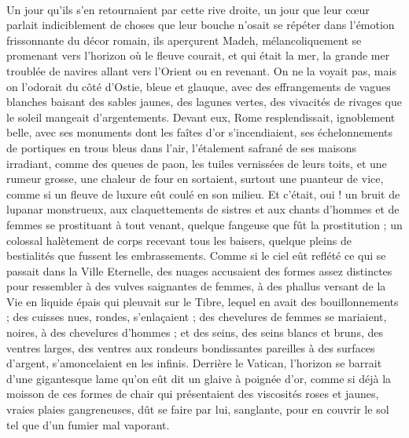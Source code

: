 \documentclass[a4paper, 11pt, oneside, polutonikogreek, french]{article}
\begin{document}
\paragraph{}
Un jour qu'ils s'en retournaient par cette rive droite, un jour que leur cœur parlait indiciblement de choses que leur bouche n'osait se répéter dans l'émotion frissonnante du décor romain, ils aperçurent Madeh, mélancoliquement se promenant vers l'horizon où le fleuve courait, et qui était la mer, la grande mer troublée de navires allant vers l'Orient ou en revenant. On ne la voyait pas, mais on l'odorait du côté d'Ostie, bleue et glauque, avec des effrangements de vagues blanches baisant des sables jaunes, des lagunes vertes, des vivacités de rivages que le soleil mangeait d'argentements. Devant eux, Rome resplendissait, ignoblement belle, avec ses monuments dont les faîtes d'or s'incendiaient, ses échelonnements de portiques en trous bleus dans l'air, l'étalement safrané de ses maisons irradiant, comme des queues de paon, les tuiles vernissées de leurs toits, et une rumeur grosse, une chaleur de four en sortaient, surtout une puanteur de vice, comme si un fleuve de luxure eût coulé en son milieu. Et c'était, oui ! un bruit de lupanar monstrueux, aux claquettements de sistres et aux chants d'hommes et de femmes se prostituant à tout venant, quelque fangeuse que fût la prostitution ; un colossal halètement de corps recevant tous les baisers, quelque pleins de bestialités que fussent les embrassements. Comme si le ciel eût reflété ce qui se passait dans la Ville Eternelle, des nuages accusaient des formes assez distinctes pour ressembler à des vulves saignantes de femmes, à des phallus versant de la Vie en liquide épais qui pleuvait sur le Tibre, lequel en avait des bouillonnements ; des cuisses nues, rondes, s'enlaçaient ; des chevelures de femmes se mariaient, noires, à des chevelures d'hommes ; et des seins, des seins blancs et bruns, des ventres larges, des ventres aux rondeurs bondissantes pareilles à des surfaces d'argent, s'amoncelaient en les infinis. Derrière le Vatican, l'horizon se barrait d'une gigantesque lame qu'on eût dit un glaive à poignée d'or, comme si déjà la moisson de ces formes de chair qui présentaient des viscosités roses et jaunes, vraies plaies gangreneuses, dût se faire par lui, sanglante, pour en couvrir le sol tel que d'un fumier mal vaporant.
\end{document}
